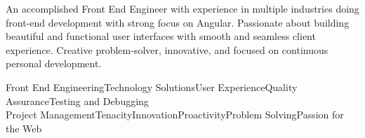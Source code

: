 

\begin{cvparagraph}

An accomplished Front End Engineer with experience in multiple industries doing front-end development with strong focus on Angular. Passionate about building beautiful and functional user interfaces with smooth and seamless client experience. Creative problem-solver, innovative, and focused on continuous personal development.

\begin{center}
\newcommand{\separator}{\space\textbar\space}
Front End Engineering\separator{}Technology Solutions\separator{}User Experience\separator{}Quality Assurance\separator{}Testing and Debugging\\
Project Management\separator{}Tenacity\separator{}Innovation\separator{}Proactivity\separator{}Problem Solving\separator{}Passion for the Web
\end{center}%
\end{cvparagraph}%